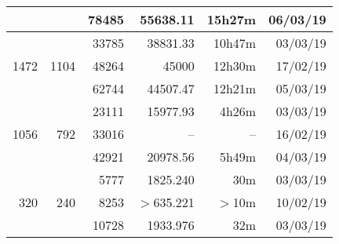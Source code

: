 \begin{center}
\begin{tabular}{ r r r | r r r }
  & & 78485 & 55638.11 & 15h27m & 06/03/19 \\
  \hline
  \multirow{3}{*}{1472} & \multirow{3}{*}{1104} & 33785 & 38831.33 & 10h47m & 03/03/19 \\
  & & 48264 & 45000 & 12h30m & 17/02/19 \\
  & & 62744 & 44507.47 & 12h21m & 05/03/19 \\
  \hline
  \multirow{3}{*}{1056} & \multirow{3}{*}{792} & 23111 & 15977.93 & 4h26m & 03/03/19 \\
  & & 33016 & -- & -- & 16/02/19 \\ %
  & & 42921 & 20978.56 & 5h49m & 04/03/19 \\
  \hline
  \multirow{3}{*}{320} & \multirow{3}{*}{240} & 5777 & 1825.240 & 30m & 03/03/19 \\
  & & 8253 & $>$635.221 & $>$10m & 10/02/19 \\
  & & 10728 & 1933.976 & 32m & 03/03/19 \\
  \end{tabular}
  \end{center}

\newpage
